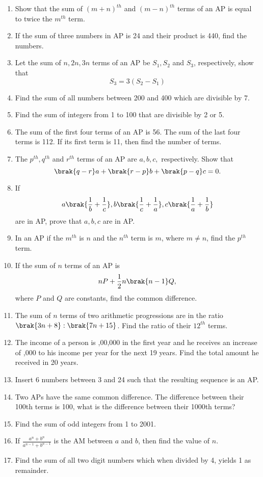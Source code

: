 \begin{enumerate}[label=\thesubsection.\arabic*, ref=\thesubsection.\theenumi]
\item Show that the sum of $(m + n)^{th}$ and $(m - n)^{th}$ terms of an AP is equal to twice the $m^{th}$ term.
\item If the sum of three numbers in AP  is 24 and their product is 440,  find the numbers.
\item Let the sum of $n,  2n,  3n$ terms of an AP be $S_1,  S_2$ and $S_3$,  respectively,  show that 
$$S_3 = 3(S_2 - S_1)$$
\item Find the sum of all numbers between 200 and 400 which are divisible by 7.
\item Find the sum of integers from 1 to 100 that are divisible by 2 or 5.
\item  The sum of the first four terms of an AP  is 56. The sum of the last four terms is 112. If its first term is 11, then find the number of terms.
\item The $p^{th}, q^{th}$ and $r^{th}$ terms of an AP  are $a, b, c,$ respectively. Show that 
$$\brak{q - r }a + \brak{r - p }b + \brak{p - q }c = 0.$$
\item If $$a\brak{\frac{1}{b}+\frac{1}{c}}, b\brak{\frac{1}{c}+\frac{1}{a}}, c\brak{\frac{1}{a}+\frac{1}{b}}$$ are in AP, prove that $a, b, c$ are in AP. 
\item In an AP if the $m^{th}$ is $n$ and the $n^{th}$ term is $m$, where $m \ne n$, find the $p^{th}$ term.
\item If the sum of $n$ terms of an AP is
	$$nP+\frac{1}{2} n\brak{n-1}Q,$$
	where $P$ and $Q$ are constants, find the common difference.
\item The sum of $n$ terms of two arithmetic progressions are in the ratio
	$\brak{3n+8}:\brak{7n+15}$.  Find the ratio of their $12^{th}$ terms.
\item The income of a person is ,00,000 in the first year and he receives an increase of ,000 to his income per year for the next 19 years.  Find the total amount he received in 20 years.
\item Insert 6 numbers between 3 and 24 such that the resulting sequence is an AP.
\item Two APs have the same common difference. The difference between their 100th terms is 100,  what is the difference between their 1000th terms?
\item Find the sum of odd integers from 1 to 2001.
\item If $\frac{a^n+b^n}{a^{n-1}+b^{n-1}}$ is the AM  between $a$ and $b$,  then find the value of $n$.
\item Find the sum of all two digit numbers which when divided by 4,  yields 1 as remainder.

\end{enumerate}
